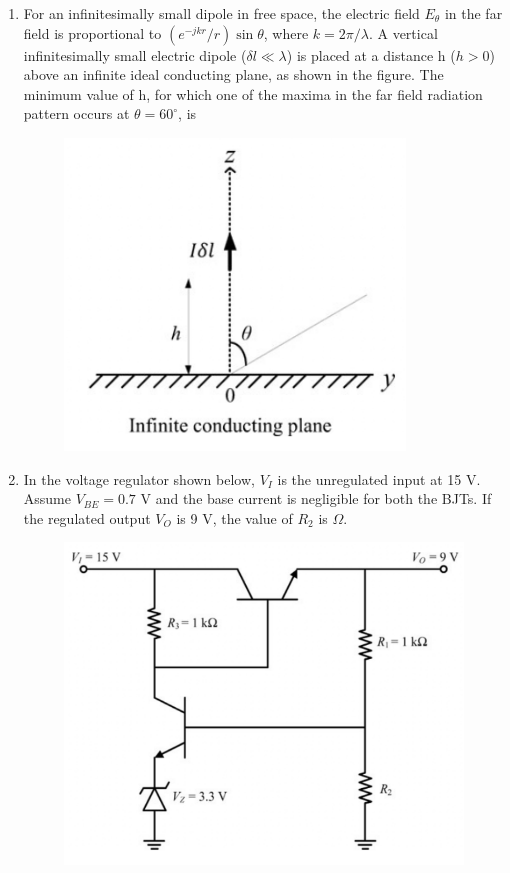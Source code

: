 \documentclass[a4paper, 11pt]{article}
\begin{document}
\begin{enumerate}
    \hfill{}

    \item For an infinitesimally small dipole in free space, the electric field $E_{\theta}$ in the far field is proportional to $(e^{-jkr}/r)\sin\theta$, where $k=2\pi/\lambda$. A vertical infinitesimally small electric dipole ($\delta l \ll \lambda$) is placed at a distance h ($h>0$) above an infinite ideal conducting plane, as shown in the figure. The minimum value of h, for which one of the maxima in the far field radiation pattern occurs at $\theta = 60^{\circ}$, is
    \begin{figure}[H]
        \centering
        \includegraphics[width=0.4\columnwidth]{figs/Q43.png}
        \caption*{}
        \label{fig:q53}
    \end{figure}
    \begin{enumerate}
    \end{enumerate}

    \hfill{}

    \item In the voltage regulator shown below, $V_I$ is the unregulated input at 15 V. Assume $V_{BE} = 0.7$ V and the base current is negligible for both the BJTs. If the regulated output $V_O$ is 9 V, the value of $R_2$ is \underline{\hspace{2cm}} $\Omega$.
    \begin{figure}[H]
        \centering
        \includegraphics[width=0.6\columnwidth]{figs/Q44.png}
        \caption*{}
        \label{fig:q54}
    \end{figure}


\end{enumerate}
\end{document}
